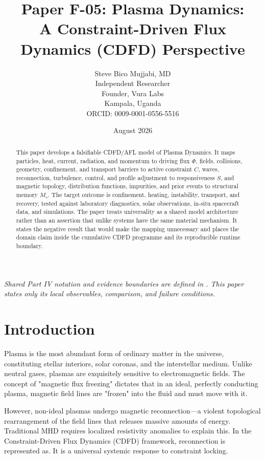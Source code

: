 \documentclass[11pt,a4paper]{article}
\title{\textbf{Paper F-05: Plasma Dynamics:\\ A Constraint-Driven Flux Dynamics (CDFD) Perspective}}
\author{Steve Bico Mujjabi, MD\\
\small Independent Researcher\\
\small Founder, Vura Labs\\
\small Kampala, Uganda\\
\small ORCID: 0009-0001-0556-5516}
\date{August 2026}
\begin{document}
\maketitle

\noindent\textit{Shared Part IV notation and evidence boundaries are defined in . This paper states only its local observables, comparison, and failure conditions.}


\begin{abstract}
This paper develops a falsifiable CDFD/AFL model of Plasma Dynamics. It maps particles, heat, current, radiation, and momentum to driving flux $\Phi$, fields, collisions, geometry, confinement, and transport barriers to active constraint $C$, waves, reconnection, turbulence, control, and profile adjustment to responsiveness $S$, and magnetic topology, distribution functions, impurities, and prior events to structural memory $M_s$. The target outcome is confinement, heating, instability, transport, and recovery, tested against laboratory diagnostics, solar observations, in-situ spacecraft data, and simulations. The paper treats universality as a shared model architecture rather than an assertion that unlike systems have the same material mechanism. It states the negative result that would make the mapping unnecessary and places the domain claim inside the cumulative CDFD programme and its reproducible runtime boundary.
\end{abstract}

\section{Introduction}

Plasma is the most abundant form of ordinary matter in the universe, constituting stellar interiors, solar coronas, and the interstellar medium. Unlike neutral gases, plasmas are exquisitely sensitive to electromagnetic fields. The concept of "magnetic flux freezing" dictates that in an ideal, perfectly conducting plasma, magnetic field lines are "frozen" into the fluid and must move with it.

However, non-ideal plasmas undergo magnetic reconnection---a violent topological rearrangement of the field lines that releases massive amounts of energy. Traditional MHD requires localized resistivity anomalies to explain this. In the Constraint-Driven Flux Dynamics (CDFD) framework, reconnection is represented as. It is a universal systemic response to constraint locking.
\end{document}

